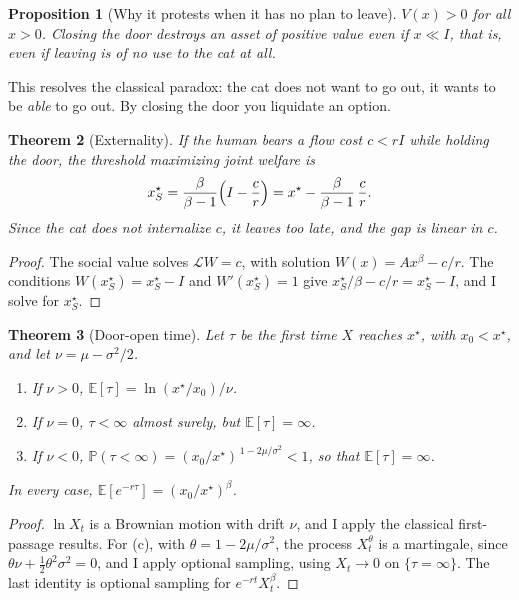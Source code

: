 \documentclass[11pt,a4paper]{article}
\theoremstyle{plain}
\newtheorem{teorema}{Theorem}[section]
\newtheorem{proposicion}[teorema]{Proposition}
\theoremstyle{definition}
\theoremstyle{remark}
\numberwithin{equation}{section}
\newcommand{\E}{\mathbb{E}}
\renewcommand{\P}{\mathbb{P}}
\begin{document}
\begin{proposicion}[Why it protests when it has no plan to leave]\label{prop:protesta}
$V(x)>0$ for all $x>0$. Closing the door destroys an asset of positive value even if $x\ll I$, that is, even if leaving is of no use to the cat at all.
\end{proposicion}

This resolves the classical paradox: the cat does not want to go out, it wants to be \emph{able} to go out. By closing the door you liquidate an option.

\begin{teorema}[Externality]\label{teo:externalidad}
If the human bears a flow cost $c<rI$ while holding the door, the threshold maximizing joint welfare is
\begin{equation}
  x_S^\star=\frac{\beta}{\beta-1}\Bigl(I-\frac{c}{r}\Bigr)=x^\star-\frac{\beta}{\beta-1}\,\frac{c}{r}.
\end{equation}
Since the cat does not internalize $c$, it leaves too late, and the gap is linear in $c$.
\end{teorema}

\begin{proof}
The social value solves $\mathcal LW=c$, with solution $W(x)=Ax^\beta-c/r$. The conditions $W(x_S^\star)=x_S^\star-I$ and $W'(x_S^\star)=1$ give $x_S^\star/\beta-c/r=x_S^\star-I$, and I solve for $x_S^\star$.
\end{proof}

\begin{teorema}[Door-open time]\label{teo:tiempo}
Let $\tau$ be the first time $X$ reaches $x^\star$, with $x_0<x^\star$, and let $\nu=\mu-\sigma^2/2$.
\begin{enumerate}[label=(\alph*),nosep]
\item If $\nu>0$, $\E[\tau]=\ln(x^\star/x_0)/\nu$.
\item If $\nu=0$, $\tau<\infty$ almost surely, but $\E[\tau]=\infty$.
\item If $\nu<0$, $\P(\tau<\infty)=(x_0/x^\star)^{\,1-2\mu/\sigma^2}<1$, so that $\E[\tau]=\infty$.
\end{enumerate}
In every case, $\E[e^{-r\tau}]=(x_0/x^\star)^\beta$.
\end{teorema}

\begin{proof}
$\ln X_t$ is a Brownian motion with drift $\nu$, and I apply the classical first-passage results. For (c), with $\theta=1-2\mu/\sigma^2$, the process $X_t^{\theta}$ is a martingale, since $\theta\nu+\tfrac12\theta^2\sigma^2=0$, and I apply optional sampling, using $X_t\to 0$ on $\{\tau=\infty\}$. The last identity is optional sampling for $e^{-rt}X_t^\beta$.
\end{proof}
\end{document}

